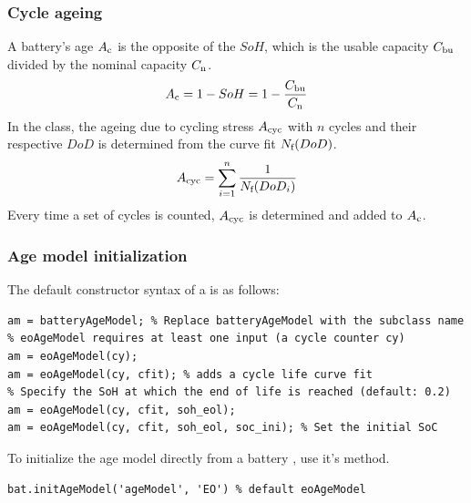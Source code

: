 \subsubsection{Cycle ageing}
A battery's age $A_\text{c}$ is the opposite of the $SoH$, which is the usable capacity $C_\text{bu}$ divided by the nominal capacity $C_\text{n}$.
\begin{equation}
\label{eq:age_soh}
A_\text{c} = 1 - SoH = 1 - \frac{C_\text{bu}}{C_\text{n}}
\end{equation}
In the  class, the ageing due to cycling stress $A_\text{cyc}$ with $n$ cycles and their respective $DoD$ is determined from the curve fit $N_\text{f}(DoD)$.
\begin{equation}
A_\text{cyc} = \sum_{i=1}^{n}\frac{1}{N_\text{f}(DoD_i)}
\end{equation}
Every time a set of cycles is counted, $A_\text{cyc}$ is determined and added to $A_\text{c}$. 

\subsubsection{Age model initialization}
The default constructor syntax of a  is as follows:
\begin{lstlisting}
am = batteryAgeModel; % Replace batteryAgeModel with the subclass name
% eoAgeModel requires at least one input (a cycle counter cy)
am = eoAgeModel(cy);
am = eoAgeModel(cy, cfit); % adds a cycle life curve fit
% Specify the SoH at which the end of life is reached (default: 0.2)
am = eoAgeModel(cy, cfit, soh_eol);
am = eoAgeModel(cy, cfit, soh_eol, soc_ini); % Set the initial SoC
\end{lstlisting}
To initialize the age model directly from a battery , use it's  method.
\begin{lstlisting}
bat.initAgeModel('ageModel', 'EO') % default eoAgeModel
\end{lstlisting}

